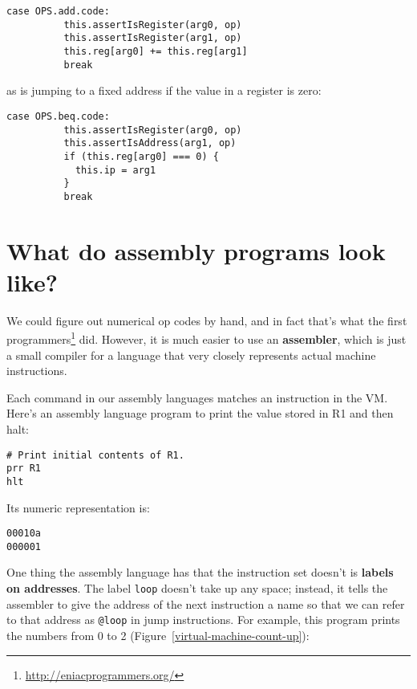 \documentclass[krantzl]{krantz}
\newcommand{\figref}[1]{Figure~\ref{#1}}
\newcommand{\glossref}[1]{\textbf{#1}}
\newcommand{\hreffoot}[2]{{#1}\footnote{\href{#2}{#2}}}
\begin{document}
\begin{lstlisting}[frame=single,frameround=tttt]
        case OPS.add.code:
          this.assertIsRegister(arg0, op)
          this.assertIsRegister(arg1, op)
          this.reg[arg0] += this.reg[arg1]
          break
\end{lstlisting}



\noindent as is jumping to a fixed address if the value in a register is zero:


\begin{lstlisting}[frame=single,frameround=tttt]
        case OPS.beq.code:
          this.assertIsRegister(arg0, op)
          this.assertIsAddress(arg1, op)
          if (this.reg[arg0] === 0) {
            this.ip = arg1
          }
          break
\end{lstlisting}


\section{What do assembly programs look like?}\label{virtual-machine-assembly}


We could figure out numerical op codes by hand,
and in fact that's what \hreffoot{the first programmers}{http://eniacprogrammers.org/} did.
However,
it is much easier to use an \glossref{assembler},
which is just a small compiler for a language that very closely represents actual machine instructions.


Each command in our assembly languages matches an instruction in the VM.
Here's an assembly language program to print the value stored in R1 and then halt:


\begin{lstlisting}[frame=single,frameround=tttt]
# Print initial contents of R1.
prr R1
hlt
\end{lstlisting}



\noindent Its numeric representation is:


\begin{lstlisting}[frame=single,frameround=tttt]
00010a
000001
\end{lstlisting}



One thing the assembly language has that the instruction set doesn't
is \glossref{labels on addresses}.
The label \texttt{loop} doesn't take up any space;
instead,
it tells the assembler to give the address of the next instruction a name
so that we can refer to that address as \texttt{@loop} in jump instructions.
For example,
this program prints the numbers from 0 to 2
(\figref{virtual-machine-count-up}):
\end{document}
